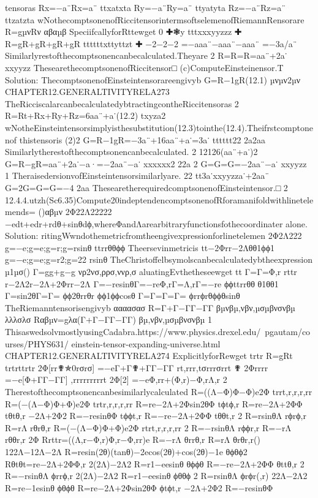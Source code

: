 {{{{{{{{{{{{{{{{tensoras
Rx=−a¨Rx=a¨
ttxatxta
Ry=−a¨Ry=a¨
ttyatyta
Rz=−a¨Rz=a¨
ttzatzta
wNothecomptsonenofRiccitensorintermsoftselemenofRiemannRensorare
R=gµνRν
αβαµβ
SpeciifcallyforRttewget
0
✚❃y
tttxxxyyzzz
✚
R=gR+gR+gR+gR
ttttttxttyttzt
✚
−2−2−2
=−aaa¨−aaa¨−aaa¨
=−3a/a¨
Similarlyrestofthecomptsonencanbecalculated.Theyare
2
R=R=R=aa¨+2a˙
xxyyzz
ThesearethecomptsonenofRiccitensor□
(c)ComputeEinsteinensor.T
Solution:
ThecomptsonenofEinsteintensorareengivyb
G=R−1gR(12.1)
µνµν2µν
CHAPTER12.GENERALTIVITYRELA273
TheRicciscalarcanbecalculatedybtractingcontheRiccitensoras
2
R=Rt+Rx+Ry+Rz=6aa¨+a˙(12.2)
txyza2
wNotheEinsteintensorsimplyisthesubstitution(12.3)tointhe(12.4).Theifrstcomptonenof
thistensoris
(2)2
G=R−1gR=−3a¨+16aa¨+a˙=3a˙
tttttt22
2a2aa
Similarlytherestofthecomptsonencanbecalculated.
2
12126(aa¨+a˙)2
G=R−gR=aa¨+2a˙−a·=−2aa¨−a˙
xxxxxx2
22a
2
G=G=G=−2aa¨−a˙
xxyyzz
1
TheraisedersionvofEinsteintensorsimilarlyare.
22
tt3a˙xxyyzza˙+2aa¨
G=2G=G=G=−4
2aa
ThesearetherequiredcomptsonenofEinsteintensor.□
2
12.4.4.utzh(Sc6.35)Compute20indeptendencomptsonenofRforamanifoldwithlinetelemends=
()αβµν
2Φ22Λ22222
−edt+edr+rdθ+sinθdϕ,whereΦandΛarearbitraryfunctionsfothecoordinater
alone.
Solution:
ritingWwndothemetricfromtheengivexpressionforlinetelemen
2Φ2Λ222
g=−e;g=e;g=r;g=rsinθ
ttrrθθϕϕ
Theersevinmetricis
tt−2Φrr−2Λθθ1ϕϕ1
g=−e;g=e;g=r2;g=22
rsinθ
TheChristoffelbsymolscanbecalculatedybtheexpression
µ1µσ()
Γ=gg+g−g
νρ2νσ,ρρσ,ννρ,σ
aluatingEvthetheseewget
tt
Γ=Γ=Φ,r
rttr
r−2Λ2r−2Λ+2Φrr−2Λ
Γ=−resinθΓ=−reΦ,rΓ=Λ,rΓ=−re
ϕϕttrrθθ
θ1θθ1
Γ=sin2θΓ=Γ=
ϕϕ2θrrθr
ϕϕ1ϕϕcosθ
Γ=Γ=Γ=Γ=
ϕrrϕrθϕϕθsinθ
TheRiemanntensorisengivyb
αααασασ
R=Γ+Γ−ΓΓ−ΓΓ
βµνβµ,νβν,µσµβνσνβµ
λλλσλσ
Rαβµν=gλα(Γ+Γ−ΓΓ−ΓΓ)
βµ,νβν,µσµβνσνβµ
1
ThisaswedsolvmostlyusingCadabra.https://www.physics.drexel.edu/~pgautam/courses/PHYS631/
einstein-tensor-expanding-universe.html
CHAPTER12.GENERALTIVITYRELA274
ExplicitlyforRewget
trtr
R=gRt
trtrttrtr
2Φ[rr✟✯0rσrσ]
=−eΓ+Γ✟+ΓΓ−ΓΓ
rt,rrr,tσrrrσrrt
✟
2Φrrrr
=−e[Φ+ΓΓ−ΓΓ]
,rrrrrrrrrt
2Φ[2]
=−eΦ,rr+(Φ,r)−Φ,rΛ,r
2
Therestofthecomptsonencanbesimilarlycalculated
R=((Λ−Φ)Φ−Φ)e2Φ
trrt,r,r,r,rr
R=(−(Λ−Φ)Φ+Φ)e2Φ
trtr,r,r,r,rr
R=re−2Λ+2Φsin2θΦ
tϕtϕ,r
R=re−2Λ+2ΦΦ
tθtθ,r
−2Λ+2Φ2
R=−resinθΦ
tϕϕt,r
R=−re−2Λ+2ΦΦ
tθθt,r
2
R=rsinθΛ
rϕrϕ,r
R=rΛ
rθrθ,r
R=(−(Λ−Φ)Φ+Φ)e2Φ
rtrt,r,r,r,rr
2
R=−rsinθΛ
rϕϕr,r
R=−rΛ
rθθr,r
2Φ
Rrttr=((Λ,r−Φ,r)Φ,r−Φ,rr)e
R=−rΛ
θrrθ,r
R=rΛ
θrθr,r()
122Λ−12Λ−2Λ
R=resin(2θ)(tanθ)−2ecos(2θ)+cos(2θ)−1e
θϕθϕ2
Rθtθt=re−2Λ+2ΦΦ,r
2(2Λ)−2Λ2
R=r1−eesinθ
θϕϕθ
R=−re−2Λ+2ΦΦ
θttθ,r
2
R=−rsinθΛ
ϕrrϕ,r
2(2Λ)−2Λ2
R=r1−eesinθ
ϕθθϕ
2
R=rsinθΛ
ϕrϕr(,r)
22Λ−2Λ2
R=re−1esinθ
ϕθϕθ
R=re−2Λ+2Φsin2θΦ
ϕtϕt,r
−2Λ+2Φ2
R=−resinθΦ
}}}}}}}}}}}}}}}}
